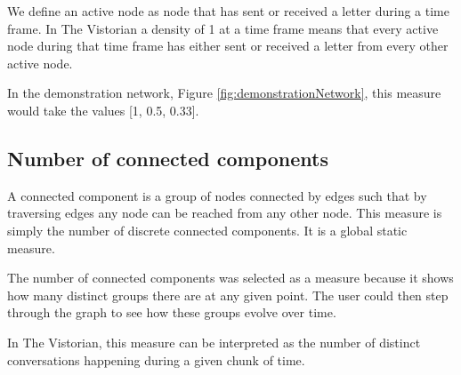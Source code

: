 We define an active node as node that has sent or received a letter during a time frame. In The Vistorian a density of 1 at a time frame means that every active node during that time frame has either sent or received a letter from every other active node.

In the demonstration network, Figure \ref{fig:demonstrationNetwork}, this measure would take the values [1, 0.5, 0.33]. 



\subsection{Number of connected components}

A connected component is a group of nodes connected by edges such that by traversing edges any node can be reached from any other node. This measure is simply the number of discrete connected components. It is a global static measure.

The number of connected components was selected as a measure because it shows how many distinct groups there are at any given point. The user could then step through the graph to see how these groups evolve over time.

In The Vistorian, this measure can be interpreted as the number of distinct conversations happening during a given chunk of time. 

